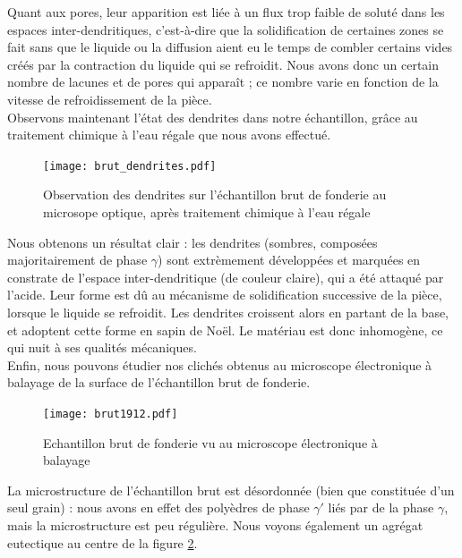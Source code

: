 Quant aux pores, leur apparition est liée à un flux trop faible de soluté 
dans les espaces inter-dendritiques, c'est-à-dire que la solidification de 
certaines zones se fait sans que le liquide ou la diffusion aient eu le 
temps de combler certains vides créés par la contraction du liquide qui
se refroidit. Nous avons donc un certain nombre de lacunes et de pores qui
apparaît ; ce nombre varie en fonction de la vitesse de refroidissement 
de la pièce.\\


Observons maintenant l'état des dendrites dans notre échantillon, grâce au 
traitement chimique à l'eau régale que nous avons effectué.\\ 


\begin{figure}[H]
    \centering
    \texttt{[image: brut\_dendrites.pdf]}
    \caption{Observation des dendrites sur l'échantillon brut de fonderie
     au microsope optique, après traitement chimique à l'eau régale}
    \label{fig:brut_dendrites_optique}
\end{figure}

Nous obtenons un résultat clair : les dendrites (sombres, composées majoritairement
de phase $\gamma$) sont extrèmement développées et marquées en constrate de 
l'espace inter-dendritique (de couleur claire), qui a été attaqué par l'acide. 
Leur forme est dû au mécanisme de solidification successive de la pièce, 
lorsque le liquide se refroidit. Les dendrites croissent alors en partant 
de la base, et adoptent cette forme en sapin de Noël. Le matériau est donc inhomogène, 
ce qui nuit à ses qualités mécaniques. \\


Enfin, nous pouvons étudier nos clichés obtenus au microscope électronique à balayage
de la surface de l'échantillon brut de fonderie. \\

\begin{figure}[H]
    \centering
    \texttt{[image: brut1912.pdf]}
    \caption{Echantillon brut de fonderie vu au microscope électronique à balayage\\}
    \label{fig:brut_MEB}
\end{figure}

La microstructure de l'échantillon brut est désordonnée (bien que constituée d'un seul grain) :
nous avons en effet des polyèdres de phase $\gamma'$ liés par de la phase $\gamma$,
mais la microstructure est peu régulière. Nous voyons également un agrégat eutectique 
au centre de la figure \ref{fig:brut_MEB}.\\


